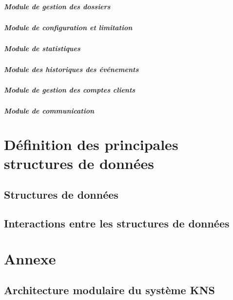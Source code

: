 \documentclass[10pt,a4paper]{report}
\begin{document}
				\subparagraph{Module de gestion des dossiers}
				\begin{flushleft}
				\end{flushleft}
	
				\subparagraph{Module de configuration et limitation}	
				\begin{flushleft}
				\end{flushleft}
	
				\subparagraph{Module de statistiques}
				\begin{flushleft}
				\end{flushleft}
	
				\subparagraph{Module des historiques des événements}
	
	
				\subparagraph{Module de gestion des comptes clients}
	
	
				\subparagraph{Module de communication}

\section{Définition des principales structures de données}

	\subsection{Structures de données}

	\subsection{Interactions entre les structures de données} %

\newpage
\section{Annexe}

\subsection{Architecture modulaire du système KNS}
	\begin{center}
	\end{center}
\end{document}

